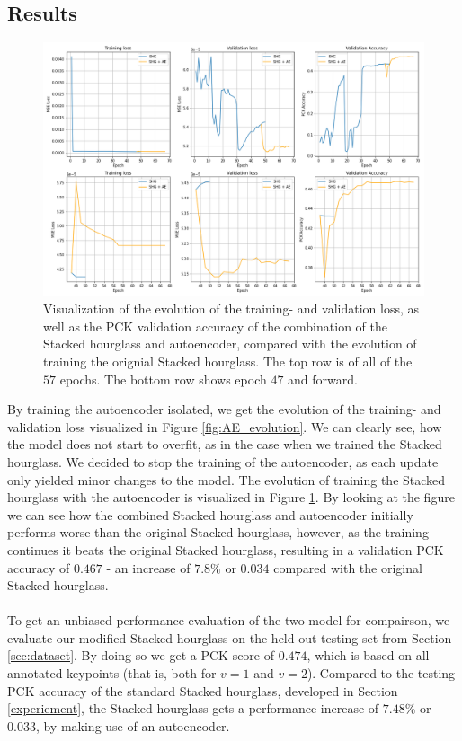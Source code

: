 \documentclass[./main.tex]{subfiles}
\begin{document}
\subsection{Results}\label{sec:improv_results}
\begin{figure}[htbp]
    \centering
    \includegraphics[width = \textwidth - 1 cm]{entities//SHG_AE_Evolution.png}
    \caption{Visualization of the evolution of the training- and validation loss, as well as the PCK validation accuracy of the combination of the Stacked hourglass and autoencoder, compared with the evolution of training the orignial Stacked hourglass. The top row is of all of the $57$ epochs. The bottom row shows epoch $47$ and forward.}
    \label{fig:SHG_AE_evolution}
\end{figure}
\noindent By training the autoencoder isolated, we get the evolution of the training- and validation loss visualized in Figure \ref{fig:AE_evolution}. We can clearly see, how the model does not start to overfit, as in the case when we trained the Stacked hourglass. We decided to stop the training of the autoencoder, as each update only yielded minor changes to the model. The evolution of training the Stacked hourglass with the autoencoder is visualized in Figure \ref{fig:SHG_AE_evolution}. By looking at the figure we can see how the combined Stacked hourglass and autoencoder initially performs worse than the original Stacked hourglass, however, as the training continues it beats the original Stacked hourglass, resulting in a validation PCK accuracy of $0.467$ - an increase of $7.8\%$ or $0.034$ compared with the original Stacked hourglass.
\\
\\
To get an unbiased performance evaluation of the two model for compairson, we evaluate our modified Stacked hourglass on the held-out testing set from Section \ref{sec:dataset}. By doing so we get a PCK score of $0.474$, which is based on all annotated keypoints (that is, both for $v = 1$ and $v = 2$). Compared to the testing PCK accuracy of the standard Stacked hourglass, developed in Section \ref{experiement}, the Stacked hourglass gets a performance increase of $7.48\%$ or $0.033$, by making use of an autoencoder.
\end{document}
